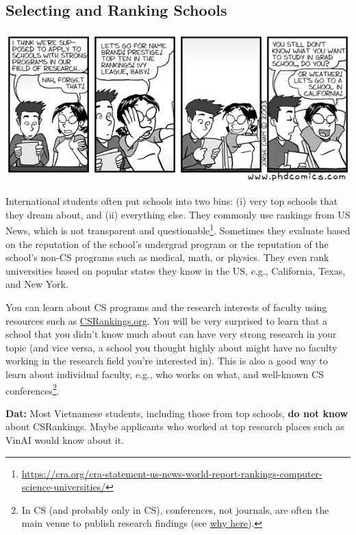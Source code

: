 \documentclass[oneside,11pt,dvipsnames]{book}
\newenvironment{commentbox}[1][]{
  \small
  \begin{mybox}
    {\small \textbf{#1}}
  }{
  \end{mybox}
}
\begin{document}
\subsection{Selecting and Ranking Schools}\label{sec:selecting-ranking-schools}
\begin{center}
  \includegraphics[scale=0.5]{files/c1.png}
\end{center}

International students often put schools into two bins: (i) very top schools that they dream about, and (ii) everything else.  They commonly use rankings from US News, which is not transparent and questionable\footnote{\url{https://cra.org/cra-statement-us-news-world-report-rankings-computer-science-universities/}}.  Sometimes they evaluate based on the reputation of the school's undergrad program or the reputation of the school's non-CS programs such as medical, math, or physics.
They even rank universities based on popular states they know in the US, e.g., California, Texas, and New York.

You can learn about CS programs and the research interests of faculty using resources such as \href{https://csrankings.org}{CSRankings.org}. You will be very surprised to learn that a school that you didn't know much about can have very strong research in your topic (and vice versa, a school you thought highly about might have no faculty working in the research field you're interested in). This is also a good way to learn about individual faculty, e.g., who works on what, and well-known CS conferences\footnote{In CS (and probably only in CS), conferences, not journals, are often the main venue to publish research findings (see \href{https://homes.cs.washington.edu/~mernst/advice/conferences-vs-journals.html}{why here}).}. %

\begin{commentbox}[Dat:] Most Vietnamese students, including those from top schools, \textbf{do not know} about CSRankings.  Maybe applicants who worked at top research places such as VinAI would know about it.
\end{commentbox}
\end{document}

